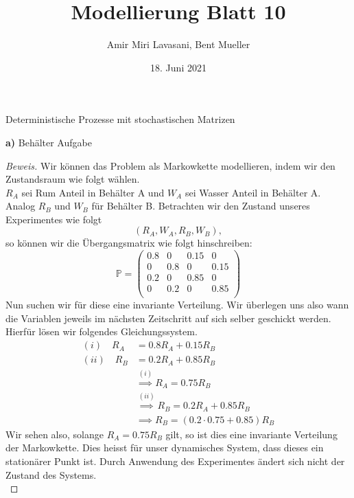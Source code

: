 \documentclass[a4paper]{article}
\newenvironment{Aufgabe}[2][Aufgabe]{\begin{trivlist}
\item[\hskip \labelsep {\bfseries #1}\hskip \labelsep {\bfseries #2.}]}{\end{trivlist}}
\begin{document}
\title{ \textbf{Modellierung Blatt 10} }
\author{Amir Miri Lavasani, Bent Mueller}
\date{18. Juni 2021}
\maketitle

\begin{theorem} %
\begin{Aufgabe}{29} %
	Deterministische Prozesse mit stochastischen Matrizen
\end{Aufgabe}

\textbf{a)} Behälter Aufgabe

\begin{proof}[Beweis]
	Wir können das Problem als Markowkette modellieren,
	indem wir den Zustandsraum wie folgt wählen.
	\\

	$R_A$ sei Rum Anteil in Behälter A und $W_A$ sei Wasser
	Anteil in Behälter A. Analog $R_B$ und $W_B$ für Behälter
	B.
	Betrachten wir den Zustand unseres Experimentes wie folgt
	\[
	\left(
		R_A, W_A, R_B, W_B
	\right),
	\] 
	so können wir die Übergangsmatrix wie folgt hinschreiben:
	\[
	\mathbb{P} = \begin{pmatrix} 
		0.8 & 0 & 0.15 & 0 \\
		0 & 0.8 & 0 & 0.15 \\
		0.2 & 0 & 0.85 & 0 \\
		0 & 0.2 & 0 & 0.85 \\
	\end{pmatrix}
	\] 
	Nun suchen wir für diese eine invariante Verteilung.
	Wir überlegen uns also wann die Variablen jeweils im
	nächsten Zeitschritt auf sich selber geschickt werden.
	Hierfür lösen wir folgendes Gleichungssystem.
	\begin{align*}
		(i) \quad R_A &= 0.8 R_A + 0.15 R_B \\
		(ii) \quad R_B &= 0.2 R_A + 0.85 R_B \\
		   & \overset{(i)} \implies R_A = 0.75 R_B \\
		   & \overset{(ii)} \implies R_B 
		   = 0.2 R_A + 0.85 R_B \\
		   & \implies R_B = \left(
		   	0.2 \cdot 0.75 + 0.85
		   \right) R_B
	\end{align*}
	Wir sehen also, solange $R_A = 0.75 R_B$ gilt, so ist dies
	eine invariante Verteilung der Markowkette. Dies heisst für 
	unser dynamisches System, dass dieses ein stationärer Punkt
	ist. Durch Anwendung des Experimentes ändert sich nicht
	der Zustand des Systems.
	\\


\end{proof}
\end{theorem}
\end{document}

